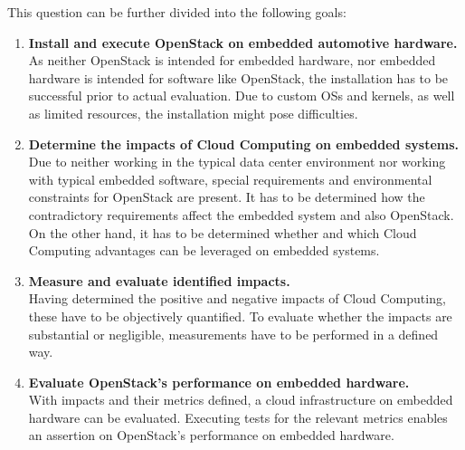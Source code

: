         \noindent This question can be further divided into the following goals:
        \begin{enumerate}
            
            \item \textbf{Install and execute OpenStack on embedded automotive hardware.}\\
            As neither OpenStack is intended for embedded hardware, nor embedded hardware is intended for software like OpenStack, the installation has to be successful prior to actual evaluation.
            Due to custom \acp{OS} and kernels, as well as limited resources, the installation might pose difficulties.
            
            \item \textbf{Determine the impacts of Cloud Computing on embedded systems.}\\
            Due to neither working in the typical data center environment nor working with typical embedded software, special requirements and environmental constraints for OpenStack are present.
            It has to be determined how the contradictory requirements affect the embedded system and also OpenStack.
            On the other hand, it has to be determined whether and which Cloud Computing advantages can be leveraged on embedded systems.
            
            \item \textbf{Measure and evaluate identified impacts.}\\
            Having determined the positive and negative impacts of Cloud Computing, these have to be objectively quantified.
            To evaluate whether the impacts are substantial or negligible, measurements have to be performed in a defined way.
            
            \item \textbf{Evaluate OpenStack's performance on embedded hardware.}\\
            With impacts and their metrics defined, a cloud infrastructure on embedded hardware can be evaluated.
            Executing tests for the relevant metrics enables an assertion on OpenStack's performance on embedded hardware.

        \end{enumerate}
    
    
